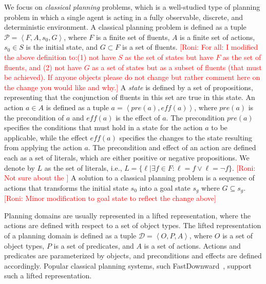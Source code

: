 \documentclass{article}
\theoremstyle{definition}
\theoremstyle{remark}
\newcommand{\tuple}[1]{\ensuremath{\left \langle #1 \right \rangle }}
\newcommand{\roni}[1]{{\textcolor{red}{[Roni: #1]}}}
\begin{document}
We focus on \emph{classical planning} problems, which is a well-studied type of planning problem in which a single agent is acting in a fully observable, discrete, and deterministic environment. 
A classical planning problem is defined as a tuple $\mathcal{P} = \tuple{F, A, s_0, G}$, where $F$ is a finite set of fluents, $A$ is a finite set of actions, $s_0 \in S$ is the initial state, and $G\subset F$ is a set of fluents. \roni{For all: I modified the above definition to:(1) not have $S$ as the set of states but have $F$ as the set of fluents, and (2) not have $G$ as a set of states but as a subset of fluents (that must be achieved). If anyone objects please do not change but rather comment here on the change you would like and why.}
A \emph{state} is defined by a set of propositions, representing that the conjunction of fluents in this set are true in this state.
An action $a\in A$ is defined as a tuple $a = \tuple{\mathit{pre}(a), \mathit{eff}(a)}$, where $\mathit{pre}(a)$ is the precondition of $a$ and $\mathit{eff}(a)$ is the effect of $a$. 
The precondition $\mathit{pre}(a)$ specifies the conditions that must hold in a state for the action $a$ to be applicable, while the effect $\mathit{eff}(a)$ specifies the changes to the state resulting from applying the action $a$.   
The precondition and effect of an action are defined each as a set of literals, which are either positive or negative propositions. We denote by $L$ as the set of literals, i.e., $L=\{\ell | \exists f\in F: \ell=f \vee \ell=\neg f\}$. \roni{Not sure about the }
A solution to a classical planning problem is a sequence of actions that transforms the initial state $s_0$ into a goal state $s_g$ where $G\subseteq s_g$. \roni{Minor modification to goal state to reflect the change above}


Planning domains are usually represented in a lifted representation, where the actions are defined with respect to a set of object types.
The lifted representation of a planning domain is defined as a tuple $\mathcal{D} = \tuple{O, P, A}$, where $O$ is a set of object types, $P$ is a set of predicates, and $A$ is a set of actions. Actions and predicates are parameterized by objects, and preconditions and effects are defined accordingly. 
Popular classical planning systems, such FastDownward~\citep{helmert2006fast}, support such a lifted representation. 
\end{document}
